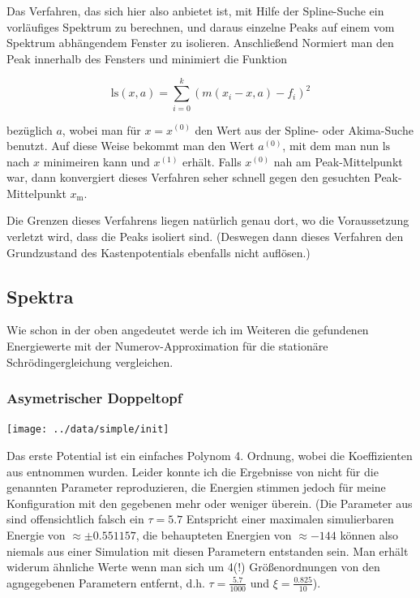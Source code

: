 \documentclass[10pt,a4paper,german]{scrartcl}
\begin{document}
       Das Verfahren, das sich hier also anbietet ist, mit Hilfe der
       Spline-Suche ein vorläufiges Spektrum zu berechnen, und daraus
       einzelne Peaks auf einem vom Spektrum abhängendem Fenster zu isolieren.
       Anschließend Normiert man den Peak innerhalb des Fensters und minimiert
       die Funktion
       
       \begin{equation}
         \mathrm{ls}(x,a) = \sum_{i = 0}^{k} (m(x_i - x, a) - f_i)^2
       \end{equation}
       
       bezüglich $a$, wobei man für $x=x^{(0)}$ den Wert aus der Spline- 
       oder Akima-Suche
       benutzt. Auf diese Weise bekommt man den Wert $a^{(0)}$, mit dem man
       nun $\mathrm{ls}$ nach $x$ minimeiren kann und $x^{(1)}$ erhält.
       Falls $x^{(0)}$ nah
       am Peak-Mittelpunkt war, dann konvergiert dieses Verfahren seher schnell
       gegen den gesuchten Peak-Mittelpunkt $x_\mathrm{m}$.
       
       Die Grenzen dieses Verfahrens liegen natürlich genau dort, wo die
       Voraussetzung verletzt wird, dass die Peaks isoliert sind. 
       (Deswegen dann dieses Verfahren den Grundzustand des Kastenpotentials 
       ebenfalls nicht auflösen.)
       
   \subsection{Spektra}
		Wie schon in der oben angedeutet werde ich im Weiteren die gefundenen
		Energiewerte mit der Numerov-Approximation für die stationäre 
		Schrödingergleichung vergleichen.
		
  	  \subsubsection{Asymetrischer Doppeltopf}
			  \texttt{[image: ../data/simple/init]}

  		  Das erste Potential ist ein einfaches Polynom 4. Ordnung, wobei die
    		Koeffizienten aus \cite{FFS} entnommen wurden. Leider konnte ich die
    		Ergebnisse von \cite{FFS} nicht für die genannten Parameter reproduzieren, 
  	  	die Energien stimmen jedoch für meine Konfiguration mit den gegebenen mehr 
  		  oder weniger überein. (Die Parameter aus \cite{FFS} sind offensichtlich falsch
    		ein $\tau = 5.7$ Entspricht einer maximalen simulierbaren Energie von
    		$\approx \pm0.551157$, die behaupteten Energien von $\approx-144$
  	  	können also niemals
    		aus einer Simulation mit diesen Parametern entstanden sein. Man erhält 
    		widerum ähnliche Werte wenn man sich um 4(!) Größenordnungen von
  	  	den agngegebenen Parametern entfernt, d.h. $\tau = \frac{5.7}{1000}$ und
  		  $\xi = \frac{0.825}{10}$).
\end{document}

